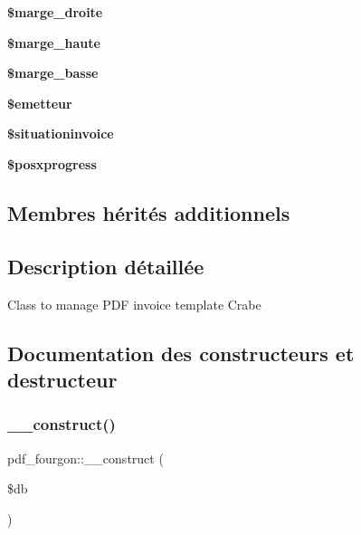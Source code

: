 \begin{DoxyCompactItemize}
{\bfseries \$marge\+\_\+droite}
\item 
\mbox{\label{classpdf__fourgon_a23fd5bd6365d0eed738aaa7577abdadf}} 
{\bfseries \$marge\+\_\+haute}
\item 
\mbox{\label{classpdf__fourgon_a58111db99fc01587b9cff6269fb32ea9}} 
{\bfseries \$marge\+\_\+basse}
\item 
\mbox{\label{classpdf__fourgon_a2e927c214c95c8ed0672680434868fee}} 
{\bfseries \$emetteur}
\item 
\mbox{\label{classpdf__fourgon_a6bfbfd1ca56cc909652136ad71a507f7}} 
{\bfseries \$situationinvoice}
\item 
\mbox{\label{classpdf__fourgon_a50b5c40eea7683356ba0ca22d746d326}} 
{\bfseries \$posxprogress}
\end{DoxyCompactItemize}
\subsection*{Membres hérités additionnels}


\subsection{Description détaillée}
Class to manage P\+DF invoice template Crabe 

\subsection{Documentation des constructeurs et destructeur}
\mbox{\label{classpdf__fourgon_a1aaf6e41cab8190f5ebb538c12840536}} 
\subsubsection{\texorpdfstring{\+\_\+\+\_\+construct()}{\_\_construct()}}
{\footnotesize\ttfamily pdf\+\_\+fourgon\+::\+\_\+\+\_\+construct (\begin{DoxyParamCaption}\item[{}]{\$db }\end{DoxyParamCaption})}

